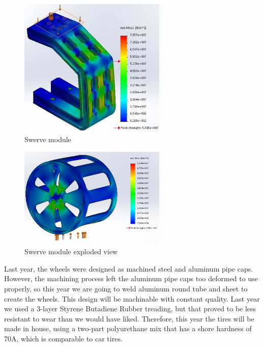 \documentclass[titlepage,twocolumn,10pt]{article}
\begin{document}
    \begin{figure}[H]
        \centering
        \includegraphics*[width = 7cm]{images/fealeg.jpg}
        \caption{Swerve module}
    \end{figure}

    \begin{figure}[H]
        \centering
        \includegraphics*[width = 7cm]{images/feawheel.png}
        \caption{Swerve module exploded view}
    \end{figure}

    Last year, the wheels were designed as machined steel and aluminum pipe caps. However, the machining process left the aluminum pipe caps too deformed to use properly, so this year we are going to weld aluminum round tube and sheet to create the wheels. This design will be  machinable with constant quality.  Last year we used a 3-layer Styrene Butadiene Rubber treading, but that proved to be less resistant to wear than we would have liked. Therefore, this year the tires will be made in house, using a two-part polyurethane mix that has a shore hardness of 70A, which is comparable to car tires.
\end{document}

